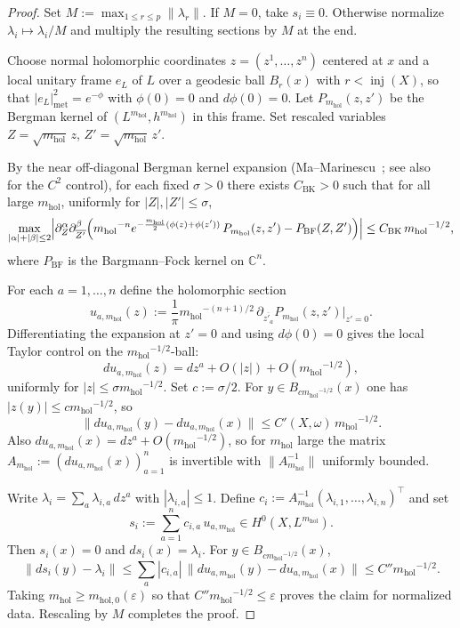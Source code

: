 \documentclass[11pt]{article}
\numberwithin{equation}{section}
\theoremstyle{plain}
\theoremstyle{definition}
\theoremstyle{remark}
\newcommand{\C}{\mathbb{C}}
\newcommand{\eps}{\varepsilon}
\newcommand{\mhol}{m_{\mathrm{hol}}}
\begin{document}
\begin{proof}
Set $M:=\max_{1\le r\le p}\|\lambda_r\|$.  If $M=0$, take $s_i\equiv 0$.  Otherwise normalize $\lambda_i\mapsto\lambda_i/M$ and multiply the resulting sections by $M$ at the end.

Choose normal holomorphic coordinates $z=(z^1,\dots,z^n)$ centered at $x$ and a local unitary frame $e_L$ of $L$ over a geodesic ball $B_r(x)$ with $r<\operatorname{inj}(X)$, so that $|e_L|^2_{\mathrm{met}}=e^{-\phi}$ with $\phi(0)=0$ and $d\phi(0)=0$.  Let $P_{{\mhol}}(z,z')$ be the Bergman kernel of $(L^{{\mhol}},h^{{\mhol}})$ in this frame.  Set rescaled variables $Z=\sqrt{{\mhol}}\,z$, $Z'=\sqrt{{\mhol}}\,z'$.

By the near off-diagonal Bergman kernel expansion (Ma--Marinescu~\cite[Thm~4.2.1]{MaMarinescu07}; see also~\cite[Thm~1.1]{MaMarinescu13OffDiag} for the $C^2$ control), for each fixed $\sigma>0$ there exists $C_{\mathrm{BK}}>0$ such that for all large ${\mhol}$, uniformly for $|Z|,|Z'|\le\sigma$,
\[
\max_{|\alpha|+|\beta|\le 2}\Bigl|
\partial_Z^\alpha\partial_{\overline{Z'}}^\beta\Bigl(
{\mhol}^{-n}e^{-\frac{{\mhol}}{2}(\phi(z)+\phi(z'))}\,P_{{\mhol}}(z,z')-P_{\mathrm{BF}}(Z,Z')
\Bigr)\Bigr|
\le C_{\mathrm{BK}}\,{\mhol}^{-1/2},
\]
where $P_{\mathrm{BF}}$ is the Bargmann--Fock kernel on $\C^n$.

For each $a=1,\dots,n$ define the holomorphic section
\[
u_{a,{\mhol}}(z):=\frac{1}{\pi}{\mhol}^{-(n+1)/2}\,\partial_{\overline{z'_a}}P_{{\mhol}}(z,z')\Big|_{z'=0}.
\]
Differentiating the expansion at $z'=0$ and using $d\phi(0)=0$ gives the local Taylor control on the ${\mhol}^{-1/2}$-ball:
\[
du_{a,{\mhol}}(z)=dz^a+O(|z|)+O({\mhol}^{-1/2}),
\]
uniformly for $|z|\le\sigma{\mhol}^{-1/2}$.  Set $c:=\sigma/2$.  For $y\in B_{c{\mhol}^{-1/2}}(x)$ one has $|z(y)|\le c{\mhol}^{-1/2}$, so
\[
\|du_{a,{\mhol}}(y)-du_{a,{\mhol}}(x)\|\le C'(X,\omega)\,{\mhol}^{-1/2}.
\]
Also $du_{a,{\mhol}}(x)=dz^a+O({\mhol}^{-1/2})$, so for ${\mhol}$ large the matrix $A_{{\mhol}}:=(du_{a,{\mhol}}(x))_{a=1}^n$ is invertible with $\|A_{{\mhol}}^{-1}\|$ uniformly bounded.

Write $\lambda_i=\sum_a \lambda_{i,a}\,dz^a$ with $|\lambda_{i,a}|\le 1$.  Define $c_i:=A_{{\mhol}}^{-1}(\lambda_{i,1},\dots,\lambda_{i,n})^\top$ and set
\[
s_i:=\sum_{a=1}^n c_{i,a}\,u_{a,{\mhol}}\in H^0(X,L^{{\mhol}}).
\]
Then $s_i(x)=0$ and $ds_i(x)=\lambda_i$.  For $y\in B_{c{\mhol}^{-1/2}}(x)$,
\[
\|ds_i(y)-\lambda_i\|\le \sum_a |c_{i,a}|\,\|du_{a,{\mhol}}(y)-du_{a,{\mhol}}(x)\|\le C''{\mhol}^{-1/2}.
\]
Taking ${\mhol}\ge m_{\mathrm{hol},0}(\eps)$ so that $C''{\mhol}^{-1/2}\le\eps$ proves the claim for normalized data.  Rescaling by $M$ completes the proof.
\end{proof}
\end{document}
